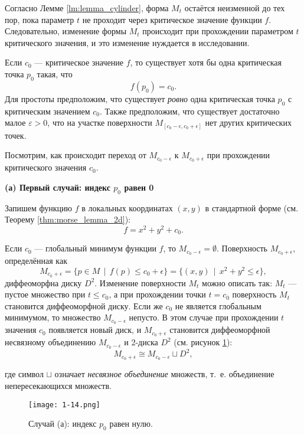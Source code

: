 \documentclass[a4paper,12pt,openany,leqno]{extbook}
\begin{document}
Согласно Лемме \ref{lm:lemma_cylinder}, форма $M_t$ остаётся неизменной до тех пор, пока параметр $t$ не проходит через критическое значение функции $f$. Следовательно, изменение формы $M_t$ происходит при прохождении параметром $t$ критического значения, и это изменение нуждается в исследовании.

Если $c_0$ --- критическое значение $f$, то существует хотя бы одна критическая точка $p_0$ такая, что
\[ f(p_0) = c_0. \]
Для простоты предположим, что существует \emph{ровно} одна критическая точка $p_0$ с критическим значением $c_0$. Также предположим, что существует достаточно малое $\varepsilon > 0$, что на участке поверхности $M_{[c_0 - \epsilon, c_0 + \epsilon]}$ нет других критических точек.

Посмотрим, как происходит переход от $M_{c_0 - \epsilon}$ к $M_{c_0 + \epsilon}$ при прохождении критического значения $c_0$.

\textbf{(а) Первый случай: индекс $p_0$ равен 0}

Запишем функцию $f$ в локальных координатах $(x, y)$ в стандартной форме (см. Теорему \ref{thm:morse_lemma_2d}):
\begin{equation}
f = x^2 + y^2 + c_0.
\end{equation}

Если $c_0$ --- глобальный минимум функции $f$, то $M_{c_0 - \epsilon} = \emptyset$. Поверхность $M_{c_0 + \epsilon}$, определённая как
\begin{equation}
M_{c_0 + \epsilon} = \{ p \in M\,\mid\,f(p) \leq c_0 + \epsilon \} = \{(x, y)\,\mid\,x^2 + y^2 \leq \epsilon\},
\end{equation}
диффеоморфна диску $D^2$. Изменение поверхности $M_t$ можно описать так: $M_t$ --- пустое множество при $t \leq c_0$, а при прохождении точки $t = c_0$ поверхность $M_t$ становится диффеоморфной диску. Если же $c_0$ не является глобальным минимумом, то множество $M_{c_0 - \epsilon}$ непусто. В этом случае при прохождении $t$ значения $c_0$ появляется новый диск, и $M_{c_0 + \epsilon}$ становится диффеоморфной несвязному объединению $M_{c_0 - \epsilon}$ и 2-диска $D^2$ (см. рисунок \ref{fig:p0_index_zero}):
\begin{equation}
M_{c_0 + \epsilon} \cong M_{c_0 - \epsilon} \sqcup D^2,
\end{equation}

где символ $\sqcup$ означает \emph{несвязное объединение} множеств, т.~е. объединение непересекающихся множеств.

\begin{figure}[ht]
\texttt{[image: 1-14.png]}
\caption{Случай (а): индекс $p_0$ равен нулю.}
\label{fig:p0_index_zero}
\end{figure}
\end{document}
